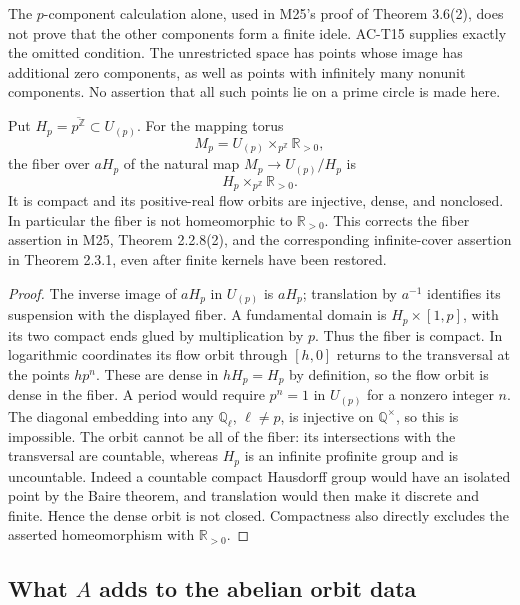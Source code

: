 The \(p\)-component calculation alone, used in M25's proof of
Theorem 3.6(2), does not prove that the other components form a
finite idele.  AC-T15 supplies exactly the omitted condition.
The unrestricted space has points whose image has additional
zero components, as well as points with infinitely many nonunit
components.  No assertion that all such points lie on a prime
circle is made here.

\begin{proposition}
\label{AC-T17}
Put \(H_p=\overline{p^{\mathbb Z}}\subset U_{(p)}\).
For the mapping torus
\[
 M_p=U_{(p)}\times_{p^{\mathbb Z}}\mathbb R_{>0},
\]
the fiber over \(aH_p\) of the natural map
\(M_p\to U_{(p)}/H_p\) is
\[
 H_p\times_{p^{\mathbb Z}}\mathbb R_{>0}.
\]
It is compact and its positive-real flow orbits are injective,
dense, and nonclosed.  In particular the fiber is not
homeomorphic to \(\mathbb R_{>0}\).
This corrects the fiber assertion in M25, Theorem 2.2.8(2),
and the corresponding infinite-cover assertion in Theorem 2.3.1,
even after finite kernels have been restored.
\end{proposition}
\begin{proof}
The inverse image of \(aH_p\) in \(U_{(p)}\) is \(aH_p\);
translation by \(a^{-1}\) identifies its suspension with the
displayed fiber.  A fundamental domain is
\(H_p\times[1,p]\), with its two compact ends glued by multiplication
by \(p\).  Thus the fiber is compact.
In logarithmic coordinates its flow orbit through \([h,0]\)
returns to the transversal at the points \(hp^n\).
These are dense in \(hH_p=H_p\) by definition, so the flow orbit
is dense in the fiber.
A period would require \(p^n=1\) in \(U_{(p)}\) for a nonzero
integer \(n\).  The diagonal embedding into any
\(\mathbb Q_\ell\), \(\ell\ne p\), is injective on
\(\mathbb Q^\times\), so this is impossible.
The orbit cannot be all of the fiber: its intersections with
the transversal are countable, whereas \(H_p\) is an infinite
profinite group and is uncountable.  Indeed a countable compact
Hausdorff group would have an isolated point by the Baire
theorem, and translation would then make it discrete and
finite.  Hence the dense orbit is
not closed.  Compactness also directly excludes the asserted
homeomorphism with \(\mathbb R_{>0}\).
\end{proof}

\subsection{What \(A\) adds to the abelian orbit data}

